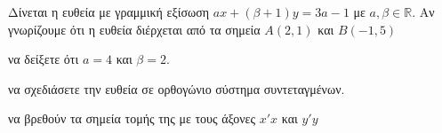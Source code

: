 Δίνεται η ευθεία με γραμμική εξίσωση $ ax+(\beta+1)y=3a-1 $ με $ a,\beta\in\mathbb{R} $. Αν γνωρίζουμε ότι η ευθεία διέρχεται από τα σημεία $ A(2,1) $ και $ B(-1,5) $
\begin{alist}
\item να δείξετε ότι $ a=4 $ και $ \beta=2 $.
\item να σχεδιάσετε την ευθεία σε ορθογώνιο σύστημα συντεταγμένων.
\item να βρεθούν τα σημεία τομής της με τους άξονες $ x'x $ και $ y'y $
\end{alist}
